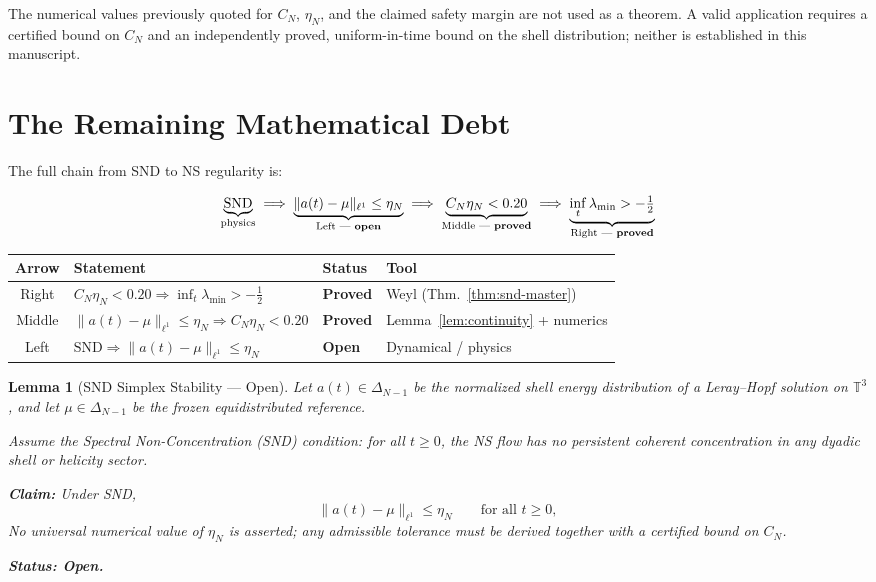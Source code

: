 \documentclass[12pt]{amsart}
\newtheorem{lemma}[theorem]{Lemma}
\theoremstyle{definition}
\newcommand{\lmin}{\lambda_{\min}}
\begin{document}
\noindent
The numerical values previously quoted for $C_N$, $\eta_N$, and the
claimed safety margin are not used as a theorem.  A valid application
requires a certified bound on $C_N$ and an independently proved,
uniform-in-time bound on the shell distribution; neither is established
in this manuscript.

\section{The Remaining Mathematical Debt}
\label{sec:debt}

The full chain from SND to NS regularity is:

\begin{equation}
\label{eq:hierarchy}
\underbrace{\mathrm{SND}}_{\text{physics}}
\;\Longrightarrow\;
\underbrace{\|a(t)-\mu\|_{\ell^1}\le\eta_N}_{\text{Left — \textbf{open}}}
\;\Longrightarrow\;
\underbrace{C_N\eta_N<0.20}_{\text{Middle — \textbf{proved}}}
\;\Longrightarrow\;
\underbrace{\inf_t\lmin>-\tfrac{1}{2}}_{\text{Right — \textbf{proved}}}
\end{equation}

\begin{center}
\renewcommand{\arraystretch}{1.4}
\begin{tabular}{clll}
\toprule
\textbf{Arrow} & \textbf{Statement} & \textbf{Status} & \textbf{Tool} \\
\midrule
Right & $C_N\eta_N<0.20\Rightarrow\inf_t\lmin>-\tfrac12$
      & \textbf{Proved} & Weyl (Thm.~\ref{thm:snd-master}) \\
Middle & $\|a(t)-\mu\|_{\ell^1}\le\eta_N\Rightarrow C_N\eta_N<0.20$
      & \textbf{Proved} & Lemma~\ref{lem:continuity} + numerics \\
Left & $\mathrm{SND}\Rightarrow\|a(t)-\mu\|_{\ell^1}\le\eta_N$
      & \textbf{Open} & Dynamical / physics \\
\bottomrule
\end{tabular}
\end{center}

\begin{tcolorbox}[openbox]
\begin{lemma}[SND Simplex Stability — Open]
\label{lem:snd-simplex}
Let $a(t)\in\Delta_{N-1}$ be the normalized shell energy distribution
of a Leray--Hopf solution on $\mathbb T^3$, and let $\mu\in\Delta_{N-1}$
be the frozen equidistributed reference.

Assume the Spectral Non-Concentration (SND) condition:
for all $t\ge0$, the NS flow has no persistent coherent concentration
in any dyadic shell or helicity sector.

\textbf{Claim:} Under SND,
\[
\|a(t)-\mu\|_{\ell^1} \le \eta_N \qquad\text{for all }t\ge0,
\]
No universal numerical value of $\eta_N$ is asserted; any admissible tolerance must be derived together with a certified bound on $C_N$.

\textbf{Status: Open.}
\end{lemma}
\end{tcolorbox}
\end{document}
